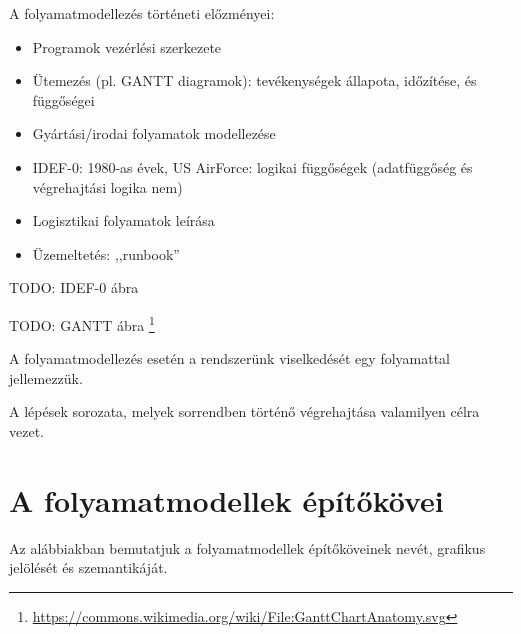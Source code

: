 \begin{megjegyzes}
A folyamatmodellezés történeti előzményei:

\begin{itemize}
	\item Programok vezérlési szerkezete
	\item Ütemezés (pl. GANTT diagramok): tevékenységek állapota, időzítése, és függőségei
	\item Gyártási/irodai folyamatok modellezése
	\item IDEF-0: 1980-as évek, US AirForce: logikai függőségek (adatfüggőség és végrehajtási logika nem)
	\item Logisztikai folyamatok leírása
	\item Üzemeltetés: ,,runbook''
\end{itemize}

TODO: IDEF-0 ábra


TODO: GANTT ábra \footnote{\url{https://commons.wikimedia.org/wiki/File:GanttChartAnatomy.svg}}
\end{megjegyzes}

A folyamatmodellezés esetén a rendszerünk viselkedését egy folyamattal jellemezzük.

\begin{definicio}
	A  lépések sorozata, melyek sorrendben történő végrehajtása valamilyen célra vezet.
\end{definicio}	

\section{A folyamatmodellek építőkövei}

Az alábbiakban bemutatjuk a folyamatmodellek építőköveinek nevét, grafikus jelölését és szemantikáját.

\begin{definicio}
	 
\end{definicio}




